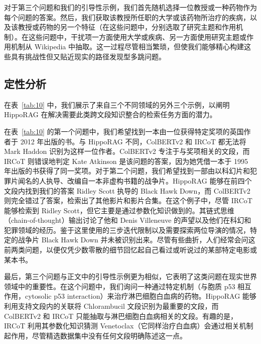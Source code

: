 \documentclass[11pt,UTF8,fontset=fandol]{ctexart}
\begin{document}
对于第三个问题和我们的引导性示例，我们首先随机选择一位教授或一种药物作为每个问题的答案。然后，我们获取该教授所任职的大学或该药物所治疗的疾病，以及该教授或药物的另一个特征（在这些问题中，分别选取了研究主题和作用机制）。在这些问题中，干扰项一方面使用大学或疾病、另一方面使用研究主题或作用机制从 Wikipedia 中抽取。这一过程尽管相当繁琐，但使我们能够精心构建这些具有挑战性但又贴近现实的路径发现型多跳问题。

\subsection{定性分析}

在表~\ref{tab:10} 中，我们展示了来自三个不同领域的另外三个示例，以阐明 HippoRAG 在解决需要此类跨文段知识整合的检索任务方面的潜力。

在表~\ref{tab:10} 的第一个问题中，我们希望找到一本由一位获得特定奖项的英国作者于 2012 年出版的书。与 HippoRAG 不同，ColBERTv2 和 IRCoT 都无法将 Mark Haddon 识别为这样一位作者。ColBERTv2 专注于与奖项相关的文段，而 IRCoT 则错误地判定 Kate Atkinson 是该问题的答案，因为她凭借一本于 1995 年出版的书获得了同一奖项。对于第二个问题，我们希望找到一部由以科幻片和犯罪片闻名的人执导、改编自一本非虚构书籍的战争片。HippoRAG 能够在前四个文段内找到我们的答案 Ridley Scott 执导的 Black Hawk Down，而 ColBERTv2 则完全错过了答案，检索出了其他影片和影片合集。在这个例子中，尽管 IRCoT 能够检索到 Ridley Scott，但它主要是通过参数化知识做到的。其链式思维（chain-of-thought）输出讨论了他和 Denis Villeneuve 的声望以及他们在科幻和犯罪领域的经历。鉴于这里使用的三步迭代限制以及需要探索两位导演的情况，特定的战争片 Black Hawk Down 并未被识别出来。尽管有些曲折，人们经常会问这前两类问题，以便仅凭少数零散的细节回忆起自己看过或听说过的某部特定电影或某本书。

最后，第三个问题与正文中的引导性示例更为相似，它表明了这类问题在现实世界领域中的重要性。在这个问题中，我们询问一种通过特定机制（与胞质 p53 相互作用，cytosolic p53 interaction）来治疗淋巴细胞白血病的药物。HippoRAG 能够利用支持文段内的关联将 Chlorambucil 文段识别为最重要的文段，而 ColBERTv2 和 IRCoT 只能抽取与淋巴细胞白血病相关的文段。有趣的是，IRCoT 利用其参数化知识猜测 Venetoclax（它同样治疗白血病）会通过相关机制起作用，尽管精选数据集中没有任何文段明确陈述这一点。
\end{document}
